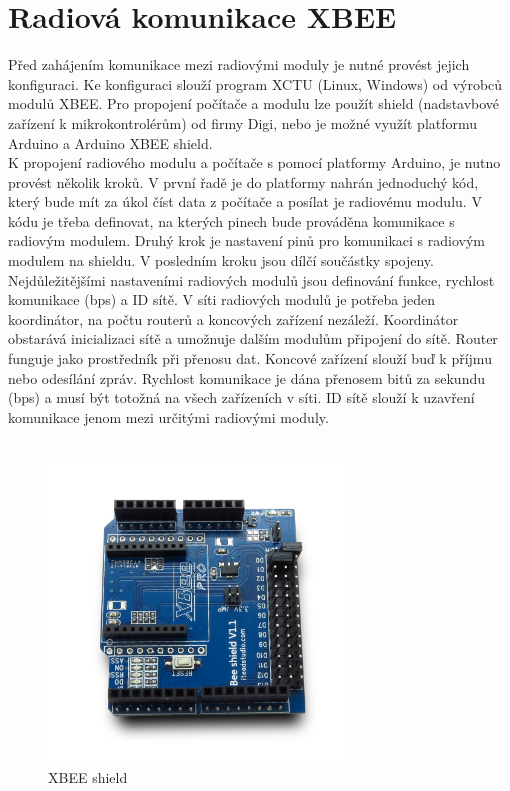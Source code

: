 \section{Radiová komunikace XBEE}
Před zahájením komunikace mezi radiovými moduly je nutné provést jejich konfi\-guraci. Ke konfiguraci slouží program XCTU (Linux, Windows) od výrobců mo\-dulů XBEE. Pro propojení počítače a modulu lze použít shield (nadstavbové zařízení k mikrokontrolérům) od firmy Digi, nebo je možné využít platformu Arduino a \mbox{Arduino} XBEE shield.\\
K propojení radiového modulu a počítače s pomocí platformy Arduino, je nutno provést několik kroků. V první řadě je do platformy nahrán jednoduchý kód, který bude mít za úkol číst data z počítače a posílat je radiovému modulu. V kódu je třeba definovat, na kterých pinech bude prováděna komunikace s radiovým mo\-dulem. Druhý krok je nastavení pinů pro komunikaci s radiovým modulem na shieldu. V posledním kroku jsou dílčí součástky spojeny.\\
Nejdůležitějšími nastaveními radiových modulů jsou definování funkce, rychlost komunikace (bps) a ID sítě. V síti radiových modulů je potřeba jeden koordinátor, na počtu routerů a koncových zařízení nezáleží. Koordinátor obstarává inicializaci sítě a umožnuje dalším modulům připojení do sítě. Router funguje jako prostředník při přenosu dat. Koncové zařízení slouží buď k příjmu nebo odesílání zpráv. Rychlost komunikace je dána přenosem bitů za sekundu (bps) a musí být totožná na všech zařízeních v síti. ID sítě slouží k uzavření komunikace jenom mezi určitými radiovými moduly. \cite{xbeetut}\\\\

\begin{figure}[H]
	\centering
	\includegraphics[width=8cm]{pictures/xbeeshield.jpg}
	\caption{XBEE shield}
\end{figure}


